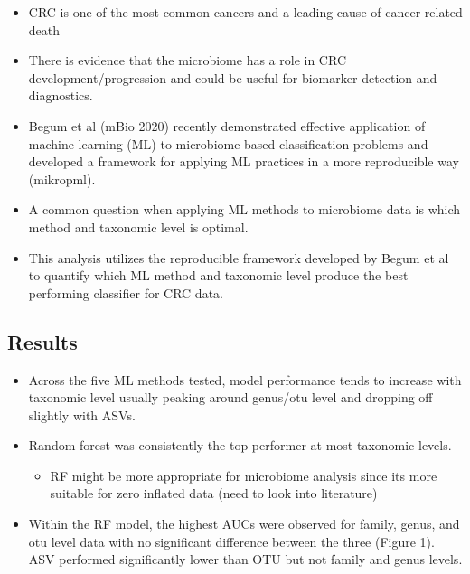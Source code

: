 \documentclass[
]{article}
\providecommand{\tightlist}{%
  \setlength{\itemsep}{0pt}\setlength{\parskip}{0pt}}
\begin{document}
\begin{itemize}
\tightlist
\item
  CRC is one of the most common cancers and a leading cause of cancer
  related death
\item
  There is evidence that the microbiome has a role in CRC
  development/progression and could be useful for biomarker detection
  and diagnostics.
\item
  Begum et al (mBio 2020) recently demonstrated effective application of
  machine learning (ML) to microbiome based classification problems and
  developed a framework for applying ML practices in a more reproducible
  way (mikropml).
\item
  A common question when applying ML methods to microbiome data is which
  method and taxonomic level is optimal.
\item
  This analysis utilizes the reproducible framework developed by Begum
  et al to quantify which ML method and taxonomic level produce the best
  performing classifier for CRC data.
\end{itemize}

\newpage

\hypertarget{results}{%
\subsection{Results}\label{results}}

\begin{itemize}
\tightlist
\item
  Across the five ML methods tested, model performance tends to increase
  with taxonomic level usually peaking around genus/otu level and
  dropping off slightly with ASVs.
\item
  Random forest was consistently the top performer at most taxonomic
  levels.

  \begin{itemize}
  \tightlist
  \item
    RF might be more appropriate for microbiome analysis since its more
    suitable for zero inflated data (need to look into literature)
  \end{itemize}
\item
  Within the RF model, the highest AUCs were observed for family, genus,
  and otu level data with no significant difference between the three
  (Figure 1). ASV performed significantly lower than OTU but not family
  and genus levels.
\end{itemize}
\end{document}

